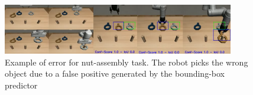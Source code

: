 \begin{figure}[bth!]
    \centering
    \includegraphics[width=0.9\textwidth]{Figures/images/nut_assembly_error/nut_assembly_error.png}
    \caption{Example of error for nut-assembly task. The robot picks the wrong object due to a false positive generated by the bounding-box predictor}
    \label{fig:nut_assembly_error}
\end{figure}
